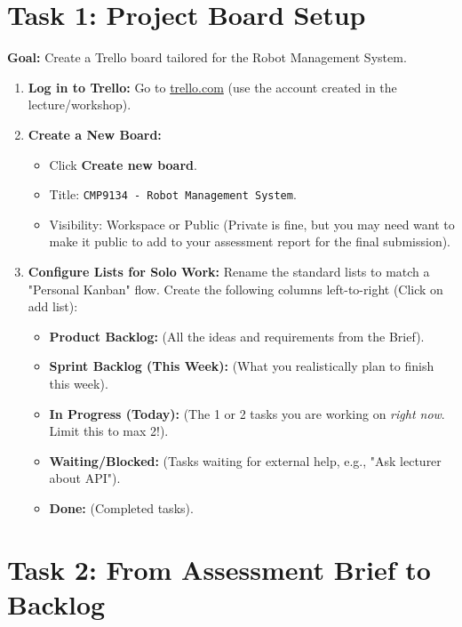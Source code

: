 \documentclass[a4paper,12pt]{article}
\begin{document}
\section*{Task 1: Project Board Setup}

\textbf{Goal:} Create a Trello board tailored for the Robot Management System.

\begin{enumerate}
    \item \textbf{Log in to Trello:} Go to \href{https://trello.com}{trello.com} (use the account created in the lecture/workshop).
    \item \textbf{Create a New Board:}
    \begin{itemize}
        \item Click \textbf{Create new board}.
        \item Title: \texttt{CMP9134 - Robot Management System}.
        \item Visibility: Workspace or Public (Private is fine, but you may need want to make it public to add to your assessment report for the final submission).
    \end{itemize}
    \item \textbf{Configure Lists for Solo Work:}
    Rename the standard lists to match a "Personal Kanban" flow. Create the following columns left-to-right (Click on add list):
    \begin{itemize}
        \item \textbf{Product Backlog:} (All the ideas and requirements from the Brief).
        \item \textbf{Sprint Backlog (This Week):} (What you realistically plan to finish this week).
        \item \textbf{In Progress (Today):} (The 1 or 2 tasks you are working on \textit{right now}. Limit this to max 2!).
        \item \textbf{Waiting/Blocked:} (Tasks waiting for external help, e.g., "Ask lecturer about API").
        \item \textbf{Done:} (Completed tasks).
    \end{itemize}
\end{enumerate}


\section*{Task 2: From Assessment Brief to Backlog}
\end{document}
